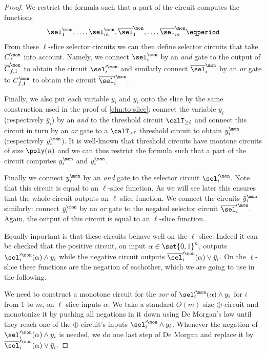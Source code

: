 \begin{proof}
  We restrict the formula such that a part of the circuit computes the
  functions
  \begin{align}
    \sel_1^\mon, \ldots, \sel^\mon_m,
    \overline\sel^\mon_1, \ldots, \overline\sel^\mon_m \eqperiod
  \end{align}
  From these $\ell$-slice selector circuits we can then define
  selector circuits that take $C_f^\mon$ into account. Namely, we
  connect $\sel_i^\mon$ by an \emph{and} gate to the output of
  $\overline C_{f,1}^\mon$ to obtain the circuit $\sel_{i}^{\prime\mon}$ and
  similarly connect $\overline \sel^\mon_i$ by an \emph{or} gate to
  $C_{f,1}^\mon$ to obtain the circuit $\overline \sel_i^{\prime\mon}$. 

  Finally, we also put each variable $y_i$ and $\bar y_i$ onto the
  slice by the same construction used in the proof of
  \cref{clm:to-slice}: connect the variable $y_i$ (respectively
  $\bar y_i$) by an \emph{and} to the threshold circuit
  $\calT_{\ge \ell}$ and connect this circuit in turn by an \emph{or}
  gate to a $\calT_{> \ell}$ threshold circuit to obtain $y_i^\mon$
  (respectively $\bar y_i^\mon$).  It is well-known \cite{Valiant84,
    BW06, Goldreich2020} that threshold circuits have montone circuits
  of size $\poly(n)$ and we can thus restrict the formula such that a
  part of the circuit computes $y_i^\mon$ and $\bar y_i^\mon$.
  
  Finally we connect $y^\mon_i$ by an \emph{and} gate to the selector
  circuit $\sel_i^{\prime\mon}$. Note that this circuit is equal to an
  $\ell$-slice function. As we will see later this ensures that the
  whole circuit outputs an $\ell$-slice function.
  We connect the circuits $\bar y^\mon_i$ similarly: connect
  $\bar y^\mon_i$ by an \emph{or} gate to the negated selector circuit
  $\overline \sel_i^{\prime\mon}$. Again, the output of this circuit
  is equal to an $\ell$-slice function.

  Equally inportant is that these circuits behave well on the
  $\ell$-slice. Indeed it can be checked that the positive circuit, on
  input $\alpha \in \set{0,1}^n$, outputs
  $\sel_i^{\prime\mon}(\alpha) \land y_i$ while the negative circuit
  outputs $\overline \sel_i^{\prime\mon}(\alpha) \lor \bar y_i$. On
  the $\ell$-slice these functions are the negation of eachother,
  which we are going to use in the following.
  
  We need to construct a monotone circuit for the \emph{xor} of
  $\sel_i^{\prime\mon}(\alpha) \wedge y_i$ for $i$ from $1$ to $m$, on
  $\ell$-slice inputs $\alpha$. We take a standard $O(m)$-size
  $\oplus$-circuit and monotonize it by pushing all negations in it
  down using De Morgan's law until they reach one of the
  $\oplus$-circuit's inputs $\sel_i^{\prime\mon} \wedge y_i$.
  Whenever the negation of $\sel_i^{\prime\mon}(\alpha) \wedge y_i$ is
  needed, we do one last step of De Morgan and replace it by
  $\overline \sel_i^{\prime\mon}(\alpha) \vee \bar{y}_i$.


\end{proof}
